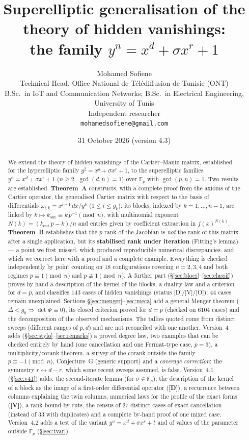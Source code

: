 \documentclass[11pt,a4paper]{article}
\title{\textbf{Superelliptic generalisation of the theory of hidden vanishings:}\\[2pt]
\Large the family $y^n = x^d + \sigma x^r + 1$}
\author{Mohamed Sofiene\\[2pt]
\small Technical Head, Office National de T\'el\'ediffusion de Tunisie (ONT)\\
\small B.Sc.\ in IoT and Communication Networks; B.Sc.\ in Electrical Engineering, University of Tunis\\
\small Independent researcher\\
\small \texttt{mohamedsofiene@gmail.com}}
\date{31 October 2026 (version 4.3)}
\newcommand{\F}{\mathbb{F}}
\begin{document}
\maketitle
\begin{abstract}
We extend the theory of hidden vanishings of the Cartier--Manin matrix,
established for the hyperelliptic family $y^2=x^d+\sigma x^r+1$, to the
superelliptic families $y^n=x^d+\sigma x^r+1$ ($n\ge2$, $\gcd(d,n)=1$) over
$\F_p$ with $\gcd(p,n)=1$. Two results are established. \textbf{Theorem~A}
constructs, with a complete proof from the axioms of the Cartier operator, the
generalised Cartier matrix with respect to the basis of differentials
$\omega_{i,k}=x^{i-1}\,dx/y^k$ ($1\le i\le g_k$): its blocks, indexed by $k=1,\dots,n-1$, are linked
by $k\mapsto k_{\mathrm{out}}\equiv k\,p^{-1}\pmod n$, with multinomial
exponent $N(k)=(k_{\mathrm{out}}\,p-k)/n$ and entries given by coefficient
extraction in $f(x)^{N(k)}$. \textbf{Theorem~B} establishes that the $p$-rank of
the Jacobian is \emph{not} the rank of this matrix after a single application,
but its \textbf{stabilised rank under iteration} (Fitting's lemma) --- a point
we first missed, which produced reproducible numerical discrepancies, and which
we correct here with a proof and a complete example. Everything is checked
independently by point counting on 18 configurations covering $n=2,3,4$ and
both regimes $p\equiv1\pmod n$ and $p\not\equiv1\pmod n$.
A further part (\S\ref{sec:blocs}--\ref{sec:classif}) proves by hand a
description of the kernel of the blocks, a duality law and a criterion for
$d=p$, and classifies $143$ cases of hidden vanishings (status
[D]/[V]/[O]); $44$ cases remain unexplained. Sections
\S\ref{sec:menger}--\ref{sec:meca} add a general Menger theorem
($\Delta<g_0\Rightarrow\det\Phi\equiv0$), its closed criterion proved for $d=p$
(checked on $6104$ cases) and the decomposition of the observed mechanisms. The tallies quoted come from distinct sweeps (different ranges of $p,d$) and are not reconciled with one another.
Version~4 adds (\S\ref{sec:stylo}--\ref{sec:remarks}) a proved degree law, two
examples that can be checked entirely by hand (one cancellation and one
Fermat-type case, $p=3$), a multiplicity/corank theorem, a survey of the
corank outside the family $p\equiv-1\pmod n$, Conjecture~G (generic support)
and a \emph{coverage correction}: the symmetry $r\leftrightarrow d-r$, which
some recent sweeps assumed, is false.
Version~4.1 (\S\ref{sec:v41}) adds: the second-iterate lemma (for
$\sigma\in\F_p$), the description of the kernel of a block as the image of a
first-order differential operator (\textbf{[D]}), a recurrence between columns
explaining the twin columns, numerical laws for the profile of the exact forms
(\textbf{[V]}), a rank bound by cuts, the census of $27$ distinct cases of exact
cancellation (instead of $33$ with duplicates) and a complete by-hand proof of
one mixed case. Version~4.2 adds a test of the variant $y^n=x^d+\sigma x^r+t$
and of values of the parameter outside $\F_p$ (\S\ref{sec:tvar}).
\end{abstract}
\end{document}
